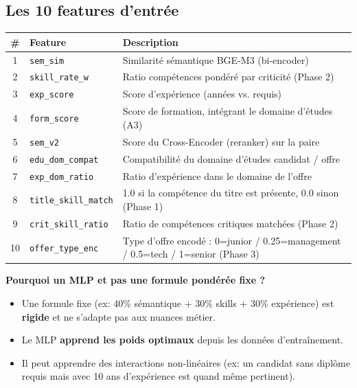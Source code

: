 \documentclass[12pt,a4paper]{report}
\newenvironment{whybox}[1][Pourquoi ce choix ?]{%
  \colorbox{yellow!20}{\textbf{\textcolor{navyblue}{#1}}}\vspace{2pt}
  \begin{framed}%
}{\end{framed}}
\begin{document}
\subsection{Les 10 features d'entrée}

\begin{center}
\begin{tabularx}{\textwidth}{clX}
\toprule
\textbf{\#} & \textbf{Feature} & \textbf{Description} \\
\midrule
1 & \texttt{sem\_sim} & Similarité sémantique BGE-M3 (bi-encoder) \\
2 & \texttt{skill\_rate\_w} & Ratio compétences pondéré par criticité (Phase 2) \\
3 & \texttt{exp\_score} & Score d'expérience (années vs. requis) \\
4 & \texttt{form\_score} & Score de formation, intégrant le domaine d'études (A3) \\
5 & \texttt{sem\_v2} & Score du Cross-Encoder (reranker) sur la paire \\
6 & \texttt{edu\_dom\_compat} & Compatibilité du domaine d'études candidat / offre \\
7 & \texttt{exp\_dom\_ratio} & Ratio d'expérience dans le domaine de l'offre \\
8 & \texttt{title\_skill\_match} & 1.0 si la compétence du titre est présente, 0.0 sinon (Phase 1) \\
9 & \texttt{crit\_skill\_ratio} & Ratio de compétences critiques matchées (Phase 2) \\
10 & \texttt{offer\_type\_enc} & Type d'offre encodé : 0=junior / 0.25=management / 0.5=tech / 1=senior (Phase 3) \\
\bottomrule
\end{tabularx}
\end{center}

\begin{whybox}[Pourquoi un MLP et pas une formule pondérée fixe ?]
\begin{itemize}
  \item Une formule fixe (ex: 40\% sémantique + 30\% skills + 30\% expérience) est
        \textbf{rigide} et ne s'adapte pas aux nuances métier.
  \item Le MLP \textbf{apprend les poids optimaux} depuis les données d'entraînement.
  \item Il peut apprendre des interactions non-linéaires (ex: un candidat sans
        diplôme requis mais avec 10 ans d'expérience est quand même pertinent).
\end{itemize}
\end{whybox}
\end{document}
